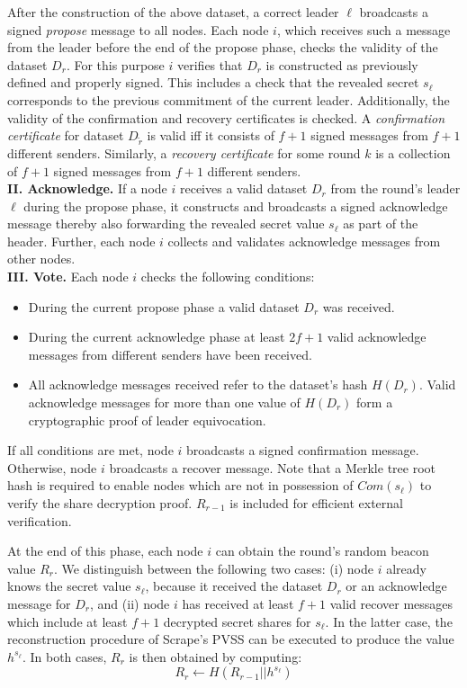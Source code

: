 \documentclass[letterpaper,twocolumn,10pt]{article}
\theoremstyle{definition}
\theoremstyle{remark}
\begin{document}
After the construction of the above dataset, a correct leader $\ell$ broadcasts a signed \textit{propose} message to all nodes. Each node $i$, which receives such a message from the leader before the end of the propose phase, checks the validity of the dataset $D_r$. For this purpose $i$ verifies that $D_r$ is constructed as previously defined and properly signed. This includes a check that the revealed secret $s_\ell$ corresponds to the previous commitment of the current leader. Additionally, the validity of the confirmation and recovery certificates is checked. A \textit{confirmation certificate} for dataset $D_{\tilde{r}}$ is valid iff it consists of $f + 1$ signed messages from $f + 1$ different senders. Similarly, a \textit{recovery certificate} for some round $k$ is a collection of $f + 1$ signed messages from $f + 1$ different senders.\\

\textbf{II. Acknowledge.} If a node $i$ receives a valid dataset $D_r$ from the round's leader $\ell$ during the propose phase, it constructs and broadcasts a signed acknowledge message thereby also forwarding the revealed secret value $s_\ell$ as part of the header. Further, each node $i$ collects and validates acknowledge messages from other nodes.\\

\textbf{III. Vote.} Each node $i$ checks the following conditions:
\begin{itemize}
\item During the current propose phase a valid dataset $D_r$ was received.
\item During the current acknowledge phase at least $2 f + 1$ valid acknowledge messages from different senders have been received.
\item All acknowledge messages received refer to the dataset's hash $H(D_r)$. Valid acknowledge messages for more than one value of $H(D_r)$ form a cryptographic proof of leader equivocation.
\end{itemize}
If all conditions are met, node $i$ broadcasts a signed confirmation message. Otherwise, node $i$ broadcasts a recover message. Note that a Merkle tree root hash is required to enable nodes which are not in possession of $Com(s_\ell)$ to verify the share decryption proof. $R_{r - 1}$ is included for efficient external verification.

At the end of this phase, each node $i$ can obtain the round's random beacon value $R_r$. We distinguish between the following two cases: (i) node $i$ already knows the secret value $s_\ell$, because it received the dataset $D_r$ or an acknowledge message for $D_r$, and (ii) node $i$ has received at least $f + 1$ valid recover messages which include at least $f + 1$ decrypted secret shares for $s_\ell$. In the latter case, the reconstruction procedure of Scrape's PVSS can be executed to produce the value $h^{s_\ell}$. In both cases, $R_r$ is then obtained by computing:
$$R_r \leftarrow H(R_{r - 1} || h^{s_\ell})$$
\end{document}

